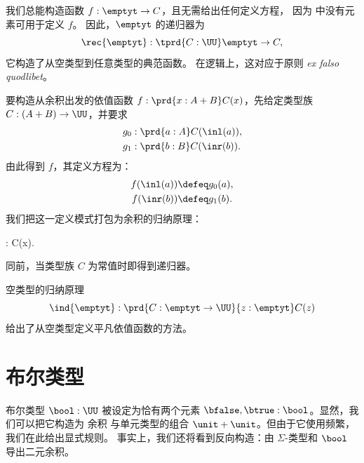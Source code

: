 我们总能构造函数 $f : \emptyt \to C$，且无需给出任何定义方程，
因为 \emptyt 中没有元素可用于定义 $f$。
因此，$\emptyt$ 的递归器为
%
\[\rec{\emptyt} : \tprd{C:\UU} \emptyt \to C,\]
它构造了从空类型到任意类型的典范函数。
在逻辑上，这对应于原则 \textit{ex falso quodlibet}。

要构造从余积出发的依值函数 $f:\prd{x:A+B}C(x)$，先给定类型族
$C: (A + B) \to \UU$，并要求
\begin{align*}
  g_0 &: \prd{a:A} C(\inl(a)), \\
  g_1 &: \prd{b:B} C(\inr(b)).
\end{align*}
由此得到 $f$，其定义方程为：
\begin{align*}
  f(\inl(a)) &\defeq g_0(a), \\
  f(\inr(b)) &\defeq g_1(b).
\end{align*}
我们把这一定义模式打包为余积的归纳原理：
%
\begin{narrowmultline*}
   :
   \to \narrowbreak
   \to {}C(x). 
\end{narrowmultline*}
同前，当类型族 $C$ 为常值时即得到递归器。 

空类型的归纳原理
%
\[ \ind{\emptyt} : \prd{C:\emptyt \to \UU}{z:\emptyt} C(z) \]
给出了从空类型定义平凡依值函数的方法。 %

%
%


\section{布尔类型}
\label{sec:type-booleans}

%
%
布尔类型 $\bool:\UU$ 被设定为恰有两个元素
$\bfalse,\btrue : \bool$。显然，我们可以把它构造为
余积
%
与单元类型的组合 $\unit + \unit$。但由于它使用频繁，我们在此给出显式规则。
事实上，我们还将看到反向构造：由 $\Sigma$-类型和 $\bool$ 导出二元余积。

